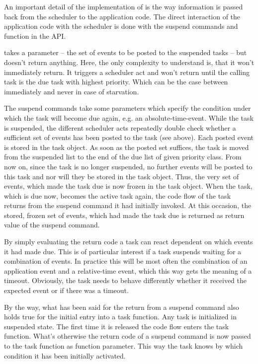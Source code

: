 An important detail of the implementation of \rtos{} is the way
information is passed back from the scheduler to the application code. The
direct interaction of the application code with the scheduler is done with the
suspend commands and function  in the \rtos{} API.

 takes a parameter -- the set of events to be posted to
the suspended tasks -- but doesn't return anything. Here, the only
complexity to understand is, that it won't immediately return. It triggers
a scheduler act and won't return until the calling task is the due task
with highest priority. Which can be the case between immediately and never
in case of starvation.

The suspend commands take some parameters which specify the condition
under which the task will become due again, e.g. an absolute-time-event.
While the task is suspended, the different scheduler acts repeatedly double
check whether a sufficient set of events has been posted to the task (see
above). Each posted event is stored in the task object. As soon as the
posted set suffices, the task is moved from the suspended list to the end
of the due list of given priority class. From now on, since the task is no
longer suspended, no further events will be posted to this task and nor
will they be stored in the task object. Thus, the very set of events, which
made the task due is now frozen in the task object. When the task, which
is due now, becomes the active task again, the code flow of the task
returns from the suspend command it had initially invoked. At this
occasion, the stored, frozen set of events, which had made the task due is
returned as return value of the suspend command.

By simply evaluating the return code a task can react dependent on which
events it had made due. This is of particular interest if a task suspends
waiting for a combination of events. In practice this will be most often
the combination of an application event and a relative-time event, which
this way gets the meaning of a timeout. Obviously, the task needs to
behave differently whether it received the expected event or if there was
a timeout.

By the way, what has been said for the return from a suspend command also
holds true for the initial entry into a task function. Any task is
initialized in suspended state. The first time it is released the code
flow enters the task function. What's otherwise the return code of a
suspend command is now passed to the task function as function parameter.
This way the task knows by which condition it has been initially
activated.

